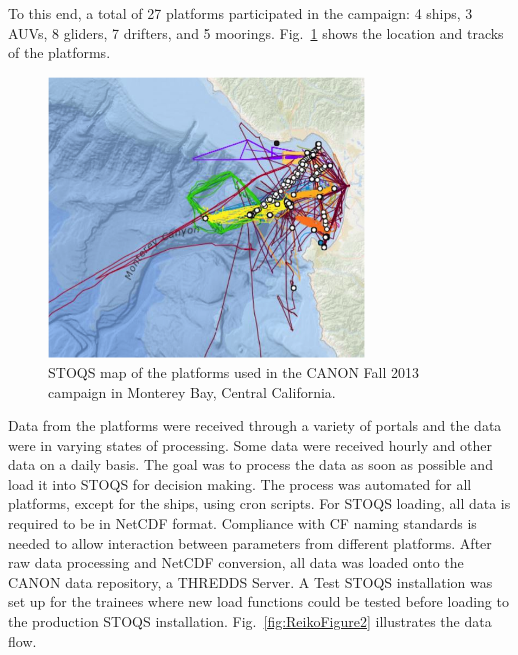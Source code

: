 To this end, a total of 27 platforms participated in the campaign: 4 ships, 3 AUVs, 8 gliders, 7 drifters, and 5 moorings.  Fig.~\ref{fig:ReikoFigure1} shows the location and tracks of the platforms.

\begin{figure}[htbp]
\centering
\includegraphics[width=3.3in]{ReikoFigure1.png}
\caption{STOQS map of the platforms used in the CANON Fall 2013 campaign in Monterey Bay, Central California.}
\label{fig:ReikoFigure1}
\end{figure}

Data from the platforms were received through a variety of portals and the data were in varying states of processing.  Some data were received hourly and other data on a daily basis.  The goal was to process the data as soon as possible and load it into STOQS for decision making.  The process was automated for all platforms, except for the ships, using cron scripts.  For STOQS loading, all data is required to be in NetCDF format.  Compliance with CF naming standards is needed to allow interaction between parameters from different platforms.  After raw data processing and NetCDF conversion, all data was loaded onto the CANON data repository, a THREDDS Server.  A Test STOQS installation was set up for the trainees where new load functions could be tested before loading to the production STOQS installation.   Fig.~\ref{fig:ReikoFigure2} illustrates the data flow.

